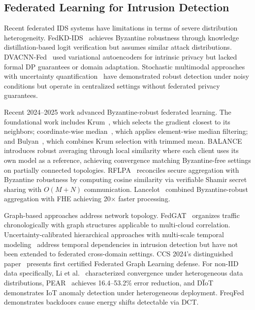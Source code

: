 \documentclass{ieeeaccess}
\theoremstyle{plain}
\theoremstyle{definition}
\theoremstyle{remark}
\begin{document}
\subsection{Federated Learning for Intrusion Detection}

Recent federated IDS systems have limitations in terms of severe distribution heterogeneity. FedKD-IDS~\cite{zhao2022} achieves Byzantine robustness through knowledge distillation-based logit verification but assumes similar attack distributions. DVACNN-Fed~\cite{preuveneers2018} used variational autoencoders for intrinsic privacy but lacked formal DP guarantees or domain adaptation. Stochastic multimodal approaches with uncertainty quantification~\cite{anaedevha2026stochastic} have demonstrated robust detection under noisy conditions but operate in centralized settings without federated privacy guarantees.

Recent 2024--2025 work advanced Byzantine-robust federated learning. The foundational work includes Krum~\cite{blanchard2017}, which selects the gradient closest to its neighbors; coordinate-wise median~\cite{yin2018}, which applies element-wise median filtering; and Bulyan~\cite{guerraoui2018}, which combines Krum selection with trimmed mean. BALANCE~\cite{fang2024} introduces robust averaging through local similarity where each client uses its own model as a reference, achieving convergence matching Byzantine-free settings on partially connected topologies. RFLPA~\cite{mai2024} reconciles secure aggregation with Byzantine robustness by computing cosine similarity via verifiable Shamir secret sharing with $O(M + N)$ communication. Lancelot~\cite{wei2025} combined Byzantine-robust aggregation with FHE achieving 20$\times$ faster processing.

Graph-based approaches address network topology. FedGAT~\cite{wu2024} organizes traffic chronologically with graph structures applicable to multi-cloud correlation. Uncertainty-calibrated hierarchical approaches with multi-scale temporal modeling~\cite{anaedevha2026gp} address temporal dependencies in intrusion detection but have not been extended to federated cross-domain settings. CCS 2024's distinguished paper~\cite{yang2024} presents first certified Federated Graph Learning defense. For non-IID data specifically, Li et al.~\cite{li2020noniid} characterized convergence under heterogeneous data distributions, PEAR~\cite{sun2025} achieves 16.4--53.2\% error reduction, and D\"IoT~\cite{nguyen2019diot} demonstrates IoT anomaly detection under heterogeneous deployment. FreqFed~\cite{fereidooni2024} demonstrates backdoors cause energy shifts detectable via DCT.
\end{document}
